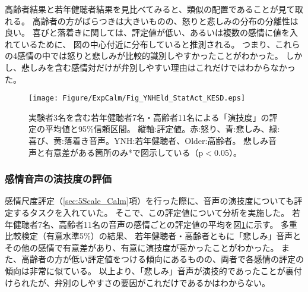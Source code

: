 高齢者結果と若年健聴者結果を見比べてみると、類似の配置であることが見て取れる。
高齢者の方がばらつきは大きいものの、怒りと悲しみの分布の分離性は良い。
喜びと落着きに関しては、評定値が低い、あるいは複数の感情に値を入れているために、
図の中心付近に分布していると推測される。
つまり、これらの4感情の中では怒りと悲しみが比較的識別しやすかったことがわかった。
しかし、悲しみを含む感情対だけが弁別しやすい理由はこれだけではわからなかった。







\begin{figure}[h]
  \vspace{-10pt}
  \centerline{\texttt{[image: Figure/ExpCalm/Fig\_YNHEld\_StatAct\_KESD.eps]}}
  \vspace{0pt}
  \caption{実験者3名を含む若年健聴者7名・高齢者11名による「演技度」の評定の平均値と95\%信頼区間。
           縦軸:評定値。赤:怒り、青:悲しみ、緑:喜び、黄:落着き音声。YNH:若年健聴者、Older:高齢者。
           悲しみ音声と有意差がある箇所のみ*で図示している（p$<$0.05）。
          }
\vspace{-15pt}
\label{fig:StatAct}
\end{figure}

\clearpage
\subsubsection{感情音声の演技度の評価}
感情尺度評定（\ref{sec:5Scale_Calm}項）を行った際に、音声の演技度についても評定するタスクを入れていた。
そこで、この評定値について分析を実施した。
若年健聴者7名、高齢者11名の音声の感情ごとの評定値の平均を図\ref{fig:StatAct}に示す。 
多重比較検定（有意水準5\%）の結果、
若年健聴者・高齢者ともに「悲しみ」音声とその他の感情で有意差があり、有意に演技度が高かったことがわかった。
また、高齢者の方が低い評定値をつける傾向にあるものの、両者で各感情の評定の傾向は非常に似ている。
以上より、「悲しみ」音声が演技的であったことが裏付けられたが、弁別のしやすさの要因がこれだけであるかはわからない。




